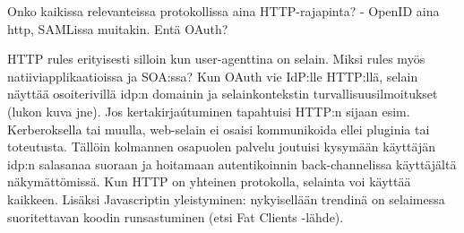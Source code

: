 \documentclass[finnish,gradu]{tktltiki}
\begin{document}
  Onko kaikissa relevanteissa protokollissa aina HTTP-rajapinta?
  - OpenID aina http, SAMLissa muitakin. Entä OAuth?

  HTTP rules erityisesti silloin kun user-agenttina on selain. Miksi rules myös natiiviapplikaatioissa ja SOA:ssa?
  Kun OAuth vie IdP:lle HTTP:llä, selain näyttää osoiterivillä idp:n domainin ja selainkontekstin turvallisuusilmoitukset (lukon kuva jne).
  Jos kertakirjaútuminen tapahtuisi HTTP:n sijaan esim. Kerberoksella tai muulla, web-selain ei osaisi kommunikoida ellei pluginia tai toteutusta.
  Tällöin kolmannen osapuolen palvelu joutuisi kysymään käyttäjän idp:n salasanaa suoraan ja hoitamaan autentikoinnin back-channelissa käyttäjältä näkymättömissä.
  Kun HTTP on yhteinen protokolla, selainta voi käyttää kaikkeen.
  Lisäksi Javascriptin yleistyminen: nykyisellään trendinä on selaimessa suoritettavan koodin runsastuminen (etsi Fat Clients -lähde).
\end{document}
